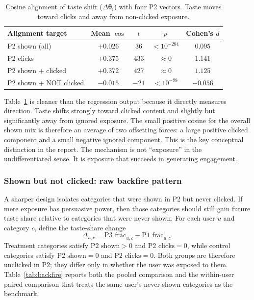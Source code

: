 \documentclass[11pt]{article}
\begin{document}
\begin{table}[ht]
\centering
\caption{Cosine alignment of taste shift ($\Delta\boldsymbol{\theta}_i$) with four P2 vectors. Taste moves toward clicks and away from non-clicked exposure.}
\label{tab:cosine_alignment}
\begin{tabular}{lcccc}
\toprule
Alignment target & Mean $\cos$ & $t$ & $p$ & Cohen's $d$ \\
\midrule
P2 shown (all) & $+0.026$ & $36$ & $< 10^{-284}$ & $0.095$ \\
P2 clicks & $+0.375$ & $433$ & $\approx 0$ & $1.141$ \\
P2 shown + clicked & $+0.372$ & $427$ & $\approx 0$ & $1.125$ \\
P2 shown + NOT clicked & $\mathbf{-0.015}$ & $-21$ & $< 10^{-98}$ & $-0.056$ \\
\bottomrule
\end{tabular}
\end{table}
\FloatBarrier

Table~\ref{tab:cosine_alignment} is cleaner than the regression output because it directly measures direction. Taste shifts strongly toward clicked content and slightly but significantly away from ignored exposure. The small positive cosine for the overall shown mix is therefore an average of two offsetting forces: a large positive clicked component and a small negative ignored component. This is the key conceptual distinction in the report. The mechanism is not ``exposure'' in the undifferentiated sense. It is exposure that succeeds in generating engagement.

\subsubsection{Shown but not clicked: raw backfire pattern}
\label{sec:shown_not_clicked}

A sharper design isolates categories that were shown in P2 but never clicked. If mere exposure has persuasive power, then those categories should still gain future taste share relative to categories that were never shown. For each user $u$ and category $c$, define the taste-share change
\[
\Delta_{u,c} = \text{P3\_frac}_{u,c} - \text{P1\_frac}_{u,c}.
\]
Treatment categories satisfy $\text{P2 shown}>0$ and $\text{P2 clicks}=0$, while control categories satisfy $\text{P2 shown}=0$ and $\text{P2 clicks}=0$. Both groups are therefore unclicked in P2; they differ only in whether the user was exposed to them. Table~\ref{tab:backfire} reports both the pooled comparison and the within-user paired comparison that treats the same user's never-shown categories as the benchmark.
\end{document}
